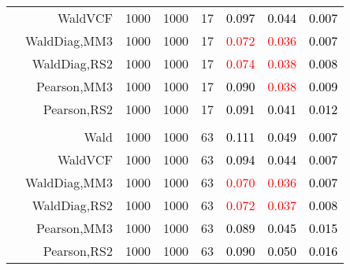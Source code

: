 \documentclass[
]{article}
\begin{document}
\begin{table}[H]
{\begin{tabular}[t]{lrrrrrrr}
\hspace{1em} & WaldVCF & 1000 & 1000 & 17 & \textcolor{black}{0.097} & \textcolor{black}{0.044} & \textcolor{black}{0.007}\\

\hspace{1em} & WaldDiag,MM3 & 1000 & 1000 & 17 & \textcolor{red}{0.072} & \textcolor{red}{0.036} & \textcolor{black}{0.007}\\

\hspace{1em} & WaldDiag,RS2 & 1000 & 1000 & 17 & \textcolor{red}{0.074} & \textcolor{red}{0.038} & \textcolor{black}{0.008}\\

\hspace{1em} & Pearson,MM3 & 1000 & 1000 & 17 & \textcolor{black}{0.090} & \textcolor{red}{0.038} & \textcolor{black}{0.009}\\

\hspace{1em} & Pearson,RS2 & 1000 & 1000 & 17 & \textcolor{black}{0.091} & \textcolor{black}{0.041} & \textcolor{black}{0.012}\\
\cmidrule{1-8}
\addlinespace[0.3em]
\multicolumn{8}{l}{\textbf{3F 15V}}\\
\hspace{1em} & Wald & 1000 & 1000 & 63 & \textcolor{black}{0.111} & \textcolor{black}{0.049} & \textcolor{black}{0.007}\\

\hspace{1em} & WaldVCF & 1000 & 1000 & 63 & \textcolor{black}{0.094} & \textcolor{black}{0.044} & \textcolor{black}{0.007}\\

\hspace{1em} & WaldDiag,MM3 & 1000 & 1000 & 63 & \textcolor{red}{0.070} & \textcolor{red}{0.036} & \textcolor{black}{0.007}\\

\hspace{1em} & WaldDiag,RS2 & 1000 & 1000 & 63 & \textcolor{red}{0.072} & \textcolor{red}{0.037} & \textcolor{black}{0.008}\\

\hspace{1em} & Pearson,MM3 & 1000 & 1000 & 63 & \textcolor{black}{0.089} & \textcolor{black}{0.045} & \textcolor{black}{0.015}\\

\hspace{1em} & Pearson,RS2 & 1000 & 1000 & 63 & \textcolor{black}{0.090} & \textcolor{black}{0.050} & \textcolor{black}{0.016}\\
\bottomrule
\end{tabular}}
\endgroup{}
\end{table}
\end{document}
